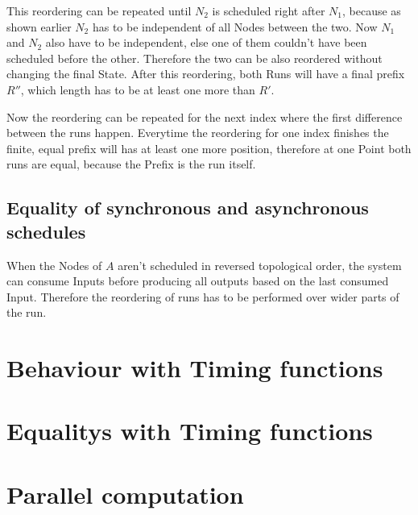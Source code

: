 This reordering can be repeated until \(N_2\) is scheduled right after \(N_1\), because as shown earlier \(N_2\) has to be independent of all Nodes between the two.
Now \(N_1\) and \(N_2\) also have to be independent, else one of them couldn't have been scheduled before the other.
Therefore the two can be also reordered without changing the final State.
After this reordering, both Runs will have a final prefix \(R''\), which length has to be at least one more than \(R'\).

Now the reordering can be repeated for the next index where the first difference between the runs happen.
Everytime the reordering for one index finishes the finite, equal prefix will has at least one more position, therefore at one Point both runs are equal, because the Prefix is the run itself.


\subsection{Equality of synchronous and asynchronous schedules}
\label{sec:concepts:equalitys_without_timing:sync_async}

When the Nodes of \(A\) aren't scheduled in reversed topological order, the system can consume Inputs before producing all outputs based on the last consumed Input.
Therefore the reordering of runs has to be performed over wider parts of the run.

\section{Behaviour with Timing functions}
\section{Equalitys with Timing functions}
\section{Parallel computation}

